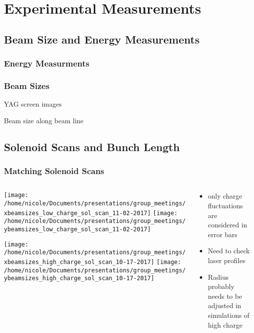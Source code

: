 \documentclass[professionalfonts,t]{beamer}
\begin{document}
\section{Experimental Measurements}
\subsection{Beam Size and Energy Measurements}

\begin{frame}
\frametitle{Energy Measurments}
\end{frame}

\begin{frame}
\frametitle{Beam Sizes}
YAG screen images 
\end{frame}

\begin{frame}
	Beam size along beam line
\end{frame}


\subsection{Solenoid Scans and Bunch Length}
\begin{frame}[t]
\frametitle{Matching Solenoid Scans}
\begin{columns}[T]
	\begin{column}{0.76\textwidth}
		\begin{minipage}{0.5\textheight}
			\texttt{[image: /home/nicole/Documents/presentations/group\_meetings/xbeamsizes\_low\_charge\_sol\_scan\_11-02-2017]}	\texttt{[image: /home/nicole/Documents/presentations/group\_meetings/ybeamsizes\_low\_charge\_sol\_scan\_11-02-2017]}
		\end{minipage}
		\begin{minipage}{0.5\textheight}
			\texttt{[image: /home/nicole/Documents/presentations/group\_meetings/xbeamsizes\_high\_charge\_sol\_scan\_10-17-2017]}
			\texttt{[image: /home/nicole/Documents/presentations/group\_meetings/ybeamsizes\_high\_charge\_sol\_scan\_10-17-2017]}
		\end{minipage}
	\end{column}
	\begin{column}{0.4\textwidth}
		\begin{itemize}
			\item only charge fluctuations are considered in error bars
			\item Need to check laser profiles  
			\item Radius probably needs to be adjusted in simulations of high charge
		\end{itemize}
	\end{column}
\end{columns}
\end{frame}
\end{document}
